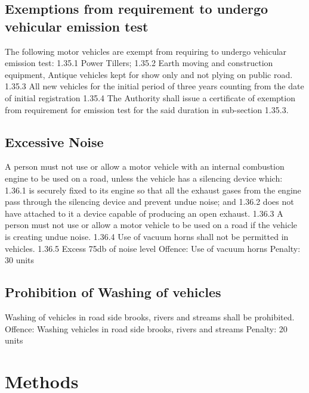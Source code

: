 \documentclass[
]{book}
\begin{document}
\hypertarget{exemptions-from-requirement-to-undergo-vehicular-emission-test}{%
\section{Exemptions from requirement to undergo vehicular emission test}\label{exemptions-from-requirement-to-undergo-vehicular-emission-test}}

The following motor vehicles are exempt from requiring to undergo vehicular emission test:
1.35.1 Power Tillers;
1.35.2 Earth moving and construction equipment, Antique vehicles kept for show only and not plying on public road.
1.35.3 All new vehicles for the initial period of three years counting from the date of initial registration
1.35.4 The Authority shall issue a certificate of exemption from requirement for emission test for the said duration in sub-section 1.35.3.

\hypertarget{excessive-noise}{%
\section{Excessive Noise}\label{excessive-noise}}

A person must not use or allow a motor vehicle with an internal combustion engine to be used on a road, unless the vehicle has a silencing device which:
1.36.1 is securely fixed to its engine so that all the exhaust gases from the engine pass through the silencing device and prevent undue noise; and
1.36.2 does not have attached to it a device capable of producing an open exhaust.
1.36.3 A person must not use or allow a motor vehicle to be used on a road if the vehicle is creating undue noise.
1.36.4 Use of vacuum horns shall not be permitted in vehicles.
1.36.5 Excess 75db of noise level
Offence: Use of vacuum horns
Penalty: 30 units

\hypertarget{prohibition-of-washing-of-vehicles}{%
\section{Prohibition of Washing of vehicles}\label{prohibition-of-washing-of-vehicles}}

Washing of vehicles in road side brooks, rivers and streams shall be prohibited.
Offence: Washing vehicles in road side brooks, rivers and streams
Penalty: 20 units

\hypertarget{methods}{%
\chapter{Methods}\label{methods}}
\end{document}
